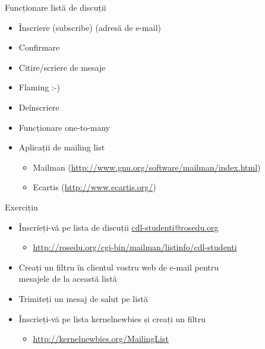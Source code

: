 \documentclass{beamer}
\begin{document}
    \begin{frame}{Funcționare listă de discuții}
    \begin{itemize}
    \setlength{\itemsep}{0.4cm}
    \item Înscriere (subscribe) (adresă de e-mail)
    \item Confirmare
    \item Citire/scriere de mesaje
    \item Flaming :-)
    \item Deînscriere
    \item Funcționare one-to-many
    \item Aplicații de mailing list
        \begin{itemize}
            \item Mailman (\url{http://www.gnu.org/software/mailman/index.html})
            \item Ecartis (\url{http://www.ecartis.org/})
        \end{itemize}
    \end{itemize}
    \end{frame}

    \begin{frame}{Exercițiu}
    \begin{itemize}
    \setlength{\itemsep}{0.5cm}
    \item Înscrieți-vă pe lista de discuții \url{cdl-studenti@rosedu.org}
        \begin{itemize}
        \item \url{http://rosedu.org/cgi-bin/mailman/listinfo/cdl-studenti}
        \end{itemize}
    \item Creați un filtru în clientul vostru web de e-mail pentru \\
        mesajele de la această listă
    \item Trimiteți un mesaj de salut pe listă
    \item Înscrieți-vă pe lista kernelnewbies și creați un filtru
        \begin{itemize}
        \item \url{http://kernelnewbies.org/MailingList}
        \end{itemize}
    \end{itemize}
    \end{frame}
\end{document}
